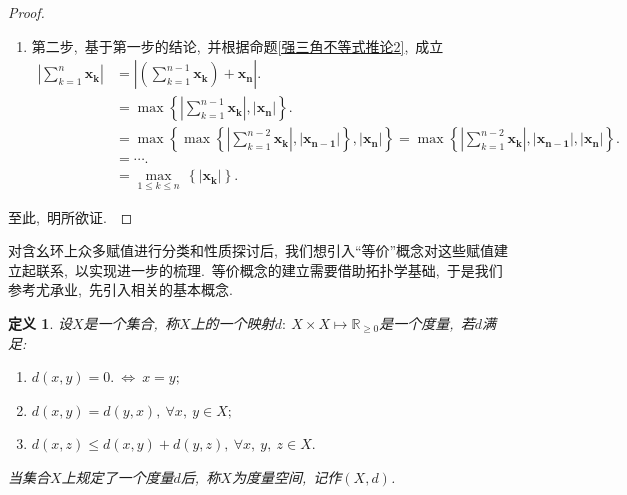 \documentclass[UTF8, twoside]{ctexart}
\theoremstyle{nonumberplain}
\newtheorem{proof}{\heiti 证明}  %
\theoremstyle{nonumberplain}
\theoremstyle{plain}
\newtheorem{dingyi}{定义}[subsection]
\begin{document}
\begin{proof}
\begin{enumerate}
\[{\begin{smallmatrix}
						1\le k\le j+1 \\ 
						k\ne {{k}_{0}},{{k}_{1}} 
				\end{smallmatrix}}^{{}}\bm{{{x}_{i,k}}}
			\right)
			+\bm{{x}_{i,{{k}_{1}}}} \right|=\max \left\{ \left| \sum\limits_{\begin{smallmatrix} 
						1\le k\le j+1 \\ 
						k\ne {{k}_{0}},{{k}_{1}} 
				\end{smallmatrix}}^{{}}\bm{{{x}_{i,k}}} \right|,\left| \bm{{x}_{i,{{k}_{1}}}} \right| \right\}\ne \left| \bm{{x}_{i,{{k}_{0}}}} \right|.
			\]
			由第一数学归纳法,\ 式(\ref{202102190114})成立.\ 
			\vskip 0.3cm
			
			\item 第二步,\ 基于第一步的结论,\ 并根据命题\ref{强三角不等式推论2},\ 成立
			\begin{align*}
				\left| \sum\limits_{k=1}^{n}\bm{{{x}_{k}}} \right|&=\left| \left( \sum\limits_{k=1}^{n-1}\bm{{{x}_{k}}}
				\right)
				+\bm{{x}_{n}} \right|. \\ 
				& =\max \left\{ \left| \sum\limits_{k=1}^{n-1}\bm{{{x}_{k}}} \right|,\left| \bm{{x}_{n}} \right| \right\}. \\ 
				& =\max \left\{ \max \left\{ \left| \sum\limits_{k=1}^{n-2}\bm{{{x}_{k}}} \right|,\left| \bm{{x}_{n-1}} \right| \right\},\left| \bm{{x}_{n}} \right| \right\}=\max \left\{ \left| \sum\limits_{k=1}^{n-2}\bm{{{x}_{k}}} \right|,\left| \bm{{x}_{n-1}} \right|,\left| \bm{{x}_{n}} \right| \right\}. \\ 
				& =\cdots.  \\ 
				& =\underset{1\le k\le n}{\mathop{\max }}\,\left\{ \left| \bm{{x}_{k}} \right| \right\}.
			\end{align*}
		\end{enumerate}
	\vskip 0.3cm
	至此,\ 明所欲证.\ 
	\end{proof}
	\vskip 0.5cm
	
	对含幺环上众多赋值进行分类和性质探讨后,\ 我们想引入“等价”概念对这些赋值建立起联系,\ 以实现进一步的梳理.\ 
	等价概念的建立需要借助拓扑学基础,\ 于是我们参考尤承业\cite[第一章 \S~1]{youchengye},\ 先引入相关的基本概念.\ 
	\begin{dingyi} \label{度量定义}
		设$X$是一个集合,\ 称$X$上的一个映射$d:\ X \times X \mapsto \mathbb{R}_{\ge 0}$是一个{\heiti 度量},\ 
		若$d$满足:\ 
		\begin{enumerate}
			\item $d \left( x,y \right) = 0.\ \Longleftrightarrow\ x = y;$
			\item $d \left( x,y \right) = d \left( y,x \right),\ \forall x,\ y \in X;$
			\item $d \left( x,z \right) \le d \left( x,y \right) + d \left( y,z \right),\ \forall x,\ y,\ z \in X.$
		\end{enumerate}
		当集合$X$上规定了一个度量$d$后,\ 称$X$为{\heiti 度量空间},\ 记作$\left( X,d \right)$.
	\end{dingyi}
	\vskip 0.5cm
	
\end{document}
